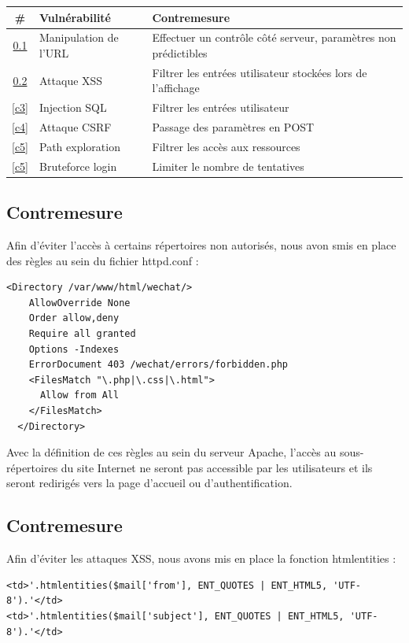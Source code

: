 \documentclass[12pt]{article}
\begin{document}
\begin{tabular}{| c | p{7.5cm} | p{7.5cm} |}
  \hline			
  \textbf{\# } &\textbf{ Vulnérabilité }& \textbf{Contremesure}\\
  \hline  
  \ref{c1} & Manipulation de l'URL & Effectuer un contrôle côté serveur, paramètres non prédictibles\\
  \hline
  \ref{c2} & Attaque XSS & Filtrer les entrées utilisateur stockées lors de l'affichage \\
  \hline
  \ref{c3} & Injection SQL & Filtrer les entrées utilisateur\\
  \hline
  \ref{c4} & Attaque CSRF & Passage des paramètres en POST \\
  \hline
  \ref{c5} & Path exploration & Filtrer les accès aux ressources \\
  \hline
  \ref{c5} & Bruteforce login & Limiter le nombre de tentatives \\
  \hline
\end{tabular}

\subsection{Contremesure}\label{c1}

Afin d'éviter l'accès à certains répertoires non autorisés, nous avon smis en place des règles au sein du fichier httpd.conf :

\begin{lstlisting}[style=JAVA]
	<Directory /var/www/html/wechat/>
    AllowOverride None
    Order allow,deny
    Require all granted
    Options -Indexes
    ErrorDocument 403 /wechat/errors/forbidden.php
    <FilesMatch "\.php|\.css|\.html">
      Allow from All
    </FilesMatch>
  </Directory>
\end{lstlisting}

Avec la définition de ces règles au sein du serveur Apache, l'accès au sous-répertoires du site Internet ne seront pas accessible par les utilisateurs et ils seront redirigés vers la page d'accueil ou d'authentification. 

\subsection{Contremesure}\label{c2}

Afin d'éviter les attaques XSS, nous avons mis en place la fonction htmlentities :

\begin{lstlisting}[style=JAVA]
<td>'.htmlentities($mail['from'], ENT_QUOTES | ENT_HTML5, 'UTF-8').'</td>
<td>'.htmlentities($mail['subject'], ENT_QUOTES | ENT_HTML5, 'UTF-8').'</td>
\end{lstlisting}
\end{document}
